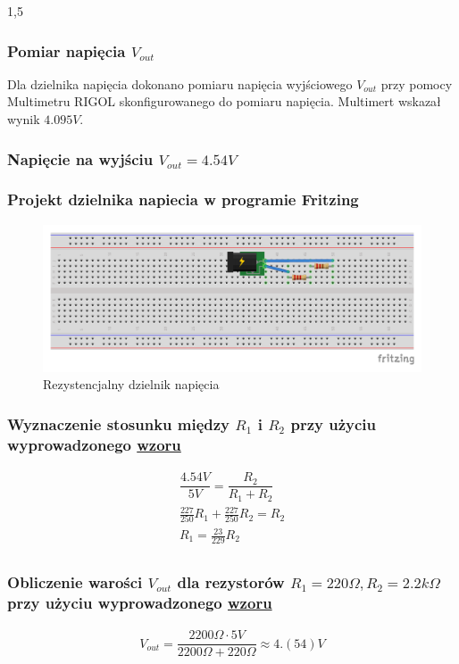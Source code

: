 \documentclass[polish,polish,a4paper]{article}
\begin{document}
\begin{spacing}{1,5}
		\subsubsection*{Pomiar napięcia $ V_{out} $}
		Dla dzielnika napięcia dokonano pomiaru napięcia wyjściowego $ V_{out} $ przy pomocy Multimetru RIGOL skonfigurowanego do pomiaru napięcia. Multimert wskazał wynik $4.095V$.
		
		
		\subsubsection{Napięcie na wyjściu $V_{out} =  4.54V $}
		\subsubsection*{Projekt dzielnika napiecia w programie Fritzing}
		
		\begin{figure}[H]
			\centering
			\includegraphics[scale=0.9]{4_54_bb.pdf}
			\caption{Rezystencjalny dzielnik napięcia}
			\label{fig:pod4_54}
		\end{figure}
		
		\subsubsection*{Wyznaczenie stosunku między $ R_{1} $ i $ R_{2} $ przy użyciu wyprowadzonego \hyperref[eq:vout]{wzoru}}
		\begin{gather*}
		\dfrac{4.54V}{5V} = \dfrac{R_{2}}{R_{1} + R_{2}}\\
		\frac{227}{250} R_{1} + \frac{227}{250}R_{2} = R_{2}\\
		R_{1} =\frac{23}{229} R_{2}\\
		\end{gather*}
		\subsubsection*{Obliczenie warości $ V_{out}$ dla rezystorów $ R_{1} = 220\Omega, R_{2} =2.2k\Omega  $  przy użyciu wyprowadzonego \hyperref[eq:vout]{wzoru}}
		\begin{gather*}
		V_{out} = \dfrac{2200\Omega \cdot 5V}{2200\Omega + 220\Omega} \approx 4.(54) V\\
		\end{gather*}

\end{spacing}
\end{document}
